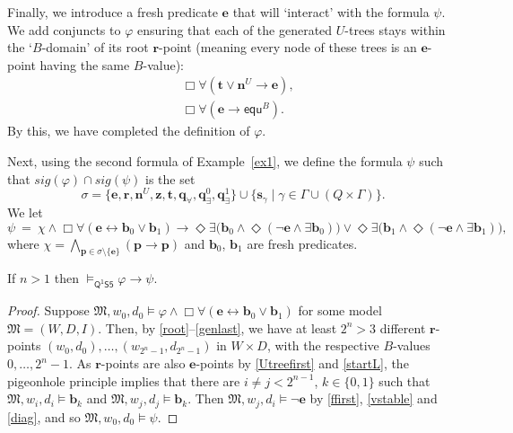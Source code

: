 \documentclass{lmcs} %
\theoremstyle{plain}\newtheorem{satz}[thm]{Satz} %
\newcommand{\diag}{\fform{e}}
\newcommand{\sig}{\mathit{sig}}
\newcommand{\FOMS}{\ensuremath{\mathsf{Q^1S5}}}
\newcommand{\fform}[1]{\boldsymbol{#1}}
\newcommand{\pvar}{\fform{p}}
\newcommand{\qvar}{\fform{q}}
\newcommand{\svar}{\fform{s}}
\newcommand{\bvar}{\fform{b}}
\newcommand{\hvar}{\fform{h}}
\newcommand{\vvar}{\fform{v}}
\newcommand{\Zvar}{\fform{z}}
\newcommand{\cR}{B}
\newcommand{\cU}{U}
\newcommand{\nextU}{\fform{n}^\cU}
\newcommand{\Bv}{\forall}
\newcommand{\Bh}{\Box}
\newcommand{\Dv}{\exists}
\newcommand{\Dh}{\Diamond}
\newcommand{\start}{\fform{r}}
\newcommand{\grid}{\mathsf{equ}}
\newcommand{\tree}{\fform{t}}
\newcommand{\qA}{\qvar_\forall}
\newcommand{\qE}{\qvar_\exists}
\begin{document}
	Finally, we introduce a fresh predicate $\diag$ that will `interact' with the formula $\psi$. We add conjuncts to $\varphi$ ensuring that 
	each of the generated $\cU$-trees stays within the 
	`$\cR$-domain' of its root $\start$-point
	(meaning every node of these trees is an $\diag$-point having the same $\cR$-value): 
	\begin{align}
		\label{startL}
		& \Bh\Bv(\tree\lor\nextU\to\diag),\\
		\label{diag}
		& \Bh\Bv(\diag\to\grid^\cR).
	\end{align}
	By this, we have completed the definition of $\varphi$.
	
	Next, using the second formula of Example~\ref{ex1}, we define the formula $\psi$ such that $\sig(\varphi)\cap\sig(\psi)$ is the set
	\[
	\sigma=\bigl\{\diag,\start,\nextU,\Zvar,\tree,\qA,\qE^0,\qE^1\bigr\}\cup
	\bigl\{\svar_\gamma\mid\gamma\in\Gamma\cup(Q\times\Gamma)\bigr\}.
	\]
	We let
	$$
	\psi ~=~  \chi\land\Bh\Bv (\diag \leftrightarrow  \bvar_0 \lor \bvar_1) \to  \Dh\Dv  \bigl(\bvar_0 \land \Dh (\neg \diag \land \Dv  \bvar_0)\bigr) \lor{} 
	\Dh\Dv  \bigl(\bvar_1 \land \Dh (\neg \diag \land \Dv  \bvar_1)\bigr),
	$$
	where %
	$\chi=\bigwedge_{\pvar\in\sigma\mathop{\setminus}\{\diag\}}(\pvar\to\pvar)$
	and $\bvar_0$, $\bvar_1$ are fresh predicates.
	
	\begin{lem}\label{l:impvalid}
		If $n>1$ then $\models_{\FOMS}\varphi\to\psi$.
	\end{lem}
%	
	\begin{proof}
		Suppose $\mathfrak M,w_0,d_0\models\varphi\land\Bh\Bv(\diag\leftrightarrow \bvar_0\lor \bvar_1)$ for some model $\mathfrak M=(W,D,I)$. Then, by \eqref{root}--\eqref{genlast}, we have at least $2^n\mathop{>} 3$ different $\start$-points $(w_0,d_0), \dots,(w_{2^n-1},d_{2^n-1})$ in $W\times D$, with the respective
		$\cR$-values $0,\dots,2^n\mathop{-}1$.
		As $\start$-points are also $\diag$-points by \eqref{Utreefirst} and \eqref{startL},
		the pigeonhole principle implies that there are $i\ne j<2^{n-1}$, $k\in\{0,1\}$ such that $\mathfrak M,w_i,d_i\models \bvar_k$ and $\mathfrak M,w_j,d_j\models \bvar_k$.
		Then $\mathfrak M,w_j,d_i\models\neg\diag$ by 
		\eqref{ffirst}, \eqref{vstable} and \eqref{diag}, 
		and so  $\mathfrak M,w_0,d_0\models\psi$.
	\end{proof}
	
\end{document}

